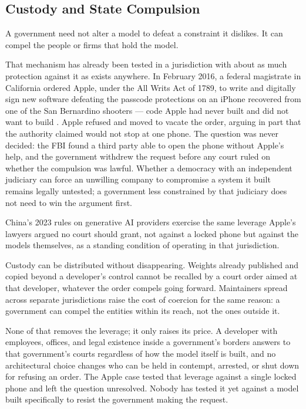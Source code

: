 \subsection{Custody and State Compulsion}
\label{sec:state-compulsion}
A government need not alter a model to defeat a constraint it dislikes.
It can compel the people or firms that hold the model.

That mechanism has already been tested in a jurisdiction with about as much protection against it as exists anywhere. In February 2016, a federal magistrate in California ordered Apple, under the All Writs Act of 1789, to write and digitally sign new software defeating the passcode protections on an iPhone recovered from one of the San Bernardino shooters — code Apple had never built and did not want to build \autocite{pym2016applefbi}. Apple refused and moved to vacate the order, arguing in part that the authority claimed would not stop at one phone. The question was never decided: the FBI found a third party able to open the phone without Apple's help, and the government withdrew the request before any court ruled on whether the compulsion was lawful. Whether a democracy with an independent judiciary can force an unwilling company to compromise a system it built remains legally untested; a government less constrained by that judiciary does not need to win the argument first.

China's 2023 rules on generative AI providers exercise the same leverage Apple's lawyers argued no court should grant, not against a locked phone but against the models themselves, as a standing condition of operating in that jurisdiction.

Custody can be distributed without disappearing. Weights already
published and copied beyond a developer's control cannot be recalled by
a court order aimed at that developer, whatever the order compels going
forward. Maintainers spread across separate jurisdictions raise the cost
of coercion for the same reason: a government can compel the entities
within its reach, not the ones outside it.

None of that removes the leverage; it only raises its price. A developer with employees, offices, and legal existence inside a government's borders answers to that government's courts regardless of how the model itself is built, and no architectural choice changes who can be held in contempt, arrested, or shut down for refusing an order. The Apple case tested that leverage against a single locked phone and left the question unresolved. Nobody has tested it yet against a model built specifically to resist the government making the request.
